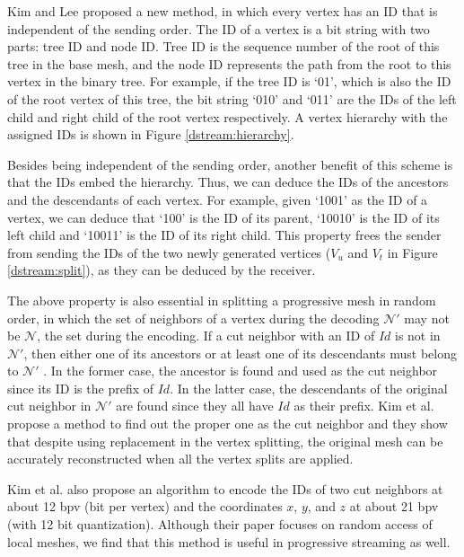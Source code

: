     Kim and Lee \cite{kim01truly} proposed a new method, in which every vertex has
    an ID that is independent of the sending order. The ID of a vertex is a bit string
    with two parts: tree ID and node ID.
    Tree ID is the sequence number of the root of this tree in the base mesh, 
    and the node ID represents the path from the root to this vertex in the binary tree.
    For example, if the tree ID is `01', which is also the ID of
    the root vertex of this tree, the bit string `010' and `011' are the IDs
    of the left child and right child of the root vertex respectively. 
    A vertex hierarchy with the assigned IDs is shown in 
    Figure \ref{dstream:hierarchy}.
    
    Besides being independent of the sending order, another benefit of this scheme
    is that the IDs embed the hierarchy. Thus,  
    we can deduce the IDs of the ancestors and the descendants of each vertex. 
    For example, given `1001' as the ID of a vertex,
    we can deduce that `100' is the ID of its parent, `10010' is the ID of its left child and 
    `10011' is the ID of its right child. 
    This property frees the sender from sending the IDs of the two newly generated vertices
    ($V_u$ and $V_t$ in Figure \ref{dstream:split}), as they can be deduced by the receiver.
    
    The above property is also essential in splitting
    a progressive mesh in random order, in which the set of neighbors of a vertex
    during the decoding $\mathcal{N}'$ may not be $\mathcal{N}$, the set 
    during the encoding. If a cut neighbor with an ID of $Id$ %
    is not in $\mathcal{N}'$, then either one of its 
    ancestors or at least one of its descendants must belong to $\mathcal{N}'$ \cite{multiresolution:kim}.
    In the former case, the ancestor is found and used as 
    the cut neighbor since its ID is the prefix of $Id$.  
    In the latter case, the descendants of the original 
    cut neighbor in $\mathcal{N}'$ are found since they all have $Id$ as their prefix.
    Kim et al. \cite{multiresolution:kim} propose a method to find out the 
    proper one as the cut neighbor and they show that despite using replacement
    in the vertex splitting, the original mesh can be 
    accurately reconstructed when all the vertex splits are applied.

    Kim et al. \cite{multiresolution:kim} also propose an algorithm
    to encode the IDs of two cut neighbors at about 12 bpv (bit per vertex) 
    and the coordinates $x$, $y$, and $z$ at about 21 bpv (with 12 bit quantization).
    Although their paper focuses on random access of local meshes, we find that this 
	method is useful in progressive streaming as well. 

